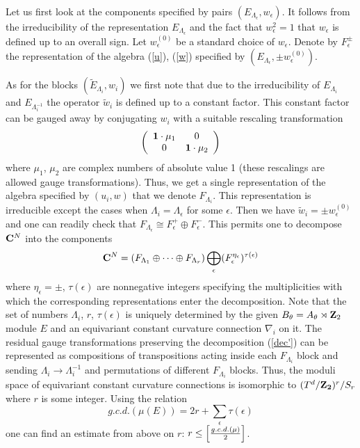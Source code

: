 \documentclass[a4paper,a4paper]{article}
\begin{document}
{Let us first look at the components specified by pairs  $(E_{\Lambda_{\epsilon}}, w_{\epsilon})$. It follows from the irreducibility 
of the representation  $E_{\Lambda_{\epsilon}}$ and the fact that $w_{\epsilon}^{2}=1$ that $w_{\epsilon}$ is defined up to an 
overall sign. Let $w^{(0)}_{\epsilon}$ be  a standard choice of $w_{\epsilon}$. Denote by  $F^{\pm}_{\epsilon}$ the representation 
of the algebra (\ref{u}), (\ref{w})  
specified by  $(E_{\Lambda_{\epsilon}}, \pm w_{\epsilon}^{(0)})$. 


As for the blocks $( \tilde E_{\Lambda_{i}}, w_{i})$ we first note that due to the irreducibility of $E_{\Lambda_{i}}$ and 
$ E_{\Lambda_{i}^{-1}}$ the operator $\tilde w_{i}$  is defined up to a  constant factor. 
This constant factor can be gauged away by conjugating $w_{i}$ with a suitable rescaling transformation 
$$
 \left(
\begin{array}{cc} {\bf 1}\cdot \mu_{1} & 0 \\ 
 0 &  {\bf 1}\cdot \mu_{2} \end{array} \right) 
$$
where $\mu_{1}$, $\mu_{2}$ are complex numbers of absolute value 1 (these rescalings are allowed gauge transformations).
Thus,  
we get a single representation of  the algebra specified by $(u_{i}, w)$  that we denote $F_{\Lambda_{i} }$. 
This representation is irreducible except the cases when  $\Lambda_{i} = \Lambda_{\epsilon}$ for some $\epsilon$. 
Then  
we have $\tilde w_{i} = \pm w^{(0)}_{\epsilon}$ and  one can readily check that 
$F_{\Lambda_{\epsilon}} \cong F_{\epsilon}^{+} \oplus F_{\epsilon}^{-}$. 
This permits one to decompose ${\bf C}^{N}$ into the components 
\begin{equation} \label{dec'}
{\bf C}^{N} = \left( F_{\Lambda_{1}}\oplus \dots \oplus F_{\Lambda_{r} } \right) 
\bigoplus_{\epsilon} (F_{\epsilon}^{\eta_{\epsilon}})^{\tau(\epsilon)} 
\end{equation}
where $\eta_{\epsilon}=\pm $, $\tau(\epsilon)$ are nonnegative integers specifying the multiplicities with which 
the corresponding representations enter the decomposition. 
Note that the set of numbers $\Lambda_{i}$, $r$, $\tau(\epsilon)$ is  uniquely determined by the given 
$B_{\theta}= A_{\theta}\rtimes {\bf Z}_{2}$ module $E$ and an equivariant constant curvature connection $\nabla_{i}$ on it. 
The residual gauge transformations preserving the decomposition (\ref{dec'}) can be represented as  compositions 
of transpositions  acting inside each  $ F_{\Lambda_{i}}$ block and sending $\Lambda_{i} \to \Lambda_{i}^{-1}$ 
and permutations of different $ F_{\Lambda_{i} }$ blocks.  Thus, the moduli space of equivariant constant curvature  connections 
 is isomorphic to  $(T^{d}/{\bf Z_{2}})^{r}/S_{r}$ where $r$ is some integer. Using the relation 
$$
 g.c.d. (\mu(E)) = 2r + \sum_{\epsilon} \tau(\epsilon)
$$
one can find an estimate from above on $r$: $r\le \Bigl[ \frac{g.c.d.(\mu)}{2} \Bigr]$.   


}
\end{document}
